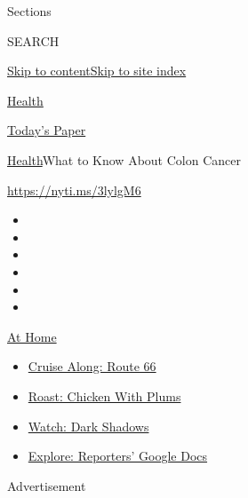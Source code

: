 Sections

SEARCH

\protect\hyperlink{site-content}{Skip to
content}\protect\hyperlink{site-index}{Skip to site index}

\href{https://www.nytimes3xbfgragh.onion/section/health}{Health}

\href{https://myaccount.nytimes3xbfgragh.onion/auth/login?response_type=cookie\&client_id=vi}{}

\href{https://www.nytimes3xbfgragh.onion/section/todayspaper}{Today's
Paper}

\href{/section/health}{Health}\textbar{}What to Know About Colon Cancer

\url{https://nyti.ms/3lylgM6}

\begin{itemize}
\item
\item
\item
\item
\item
\item
\end{itemize}

\href{https://www.nytimes3xbfgragh.onion/spotlight/at-home?action=click\&pgtype=Article\&state=default\&region=TOP_BANNER\&context=at_home_menu}{At
Home}

\begin{itemize}
\tightlist
\item
  \href{https://www.nytimes3xbfgragh.onion/2020/09/07/travel/route-66.html?action=click\&pgtype=Article\&state=default\&region=TOP_BANNER\&context=at_home_menu}{Cruise
  Along: Route 66}
\item
  \href{https://www.nytimes3xbfgragh.onion/2020/09/04/dining/sheet-pan-chicken.html?action=click\&pgtype=Article\&state=default\&region=TOP_BANNER\&context=at_home_menu}{Roast:
  Chicken With Plums}
\item
  \href{https://www.nytimes3xbfgragh.onion/2020/09/04/arts/television/dark-shadows-stream.html?action=click\&pgtype=Article\&state=default\&region=TOP_BANNER\&context=at_home_menu}{Watch:
  Dark Shadows}
\item
  \href{https://www.nytimes3xbfgragh.onion/interactive/2020/at-home/even-more-reporters-editors-diaries-lists-recommendations.html?action=click\&pgtype=Article\&state=default\&region=TOP_BANNER\&context=at_home_menu}{Explore:
  Reporters' Google Docs}
\end{itemize}

Advertisement

